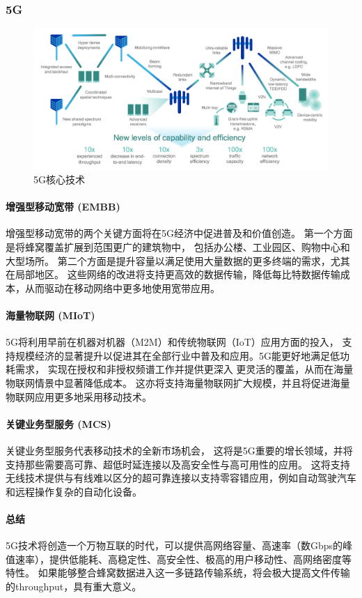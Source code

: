 \documentclass[11pt]{article}
\begin{document}
\subsubsection{5G}
\begin{figure}[H]
    \begin{center}
    \includegraphics[width=\textwidth]{figures//5g_tech.png}
    \caption{5G核心技术}
    \end{center}
\end{figure}
\paragraph{增强型移动宽带 (EMBB)}
增强型移动宽带的两个关键方面将在5G经济中促进普及和价值创造。
第一个方面是将蜂窝覆盖扩展到范围更广的建筑物中，
包括办公楼、工业园区、购物中心和大型场所。
第二个方面是提升容量以满足使用大量数据的更多终端的需求，尤其在局部地区。
这些网络的改进将支持更高效的数据传输，降低每比特数据传输成本，从而驱动在移动网络中更多地使用宽带应用。
\paragraph{海量物联网 (MIoT)}
5G将利用早前在机器对机器（M2M）和传统物联网（IoT）应用方面的投入，
支持规模经济的显著提升以促进其在全部行业中普及和应用。5G能更好地满足低功耗需求，
实现在授权和非授权频谱工作并提供更深入 更灵活的覆盖，从而在海量物联网情景中显著降低成本。
这亦将支持海量物联网扩大规模，并且将促进海量物联网应用更多地采用移动技术。
\paragraph{关键业务型服务 (MCS)}
关键业务型服务代表移动技术的全新市场机会，
这将是5G重要的增长领域，并将支持那些需要高可靠、超低时延连接以及高安全性与高可用性的应用。
这将支持无线技术提供与有线难以区分的超可靠连接以支持零容错应用，例如自动驾驶汽车和远程操作复杂的自动化设备。
\paragraph{总结}
5G技术将创造一个万物互联的时代，可以提供高网络容量、高速率（数Gbps的峰值速率），提供低能耗、高稳定性、高安全性、极高的用户移动性、高网络密度等特性。
如果能够整合蜂窝数据进入这一多链路传输系统，将会极大提高文件传输的throughput，具有重大意义。
\end{document}
